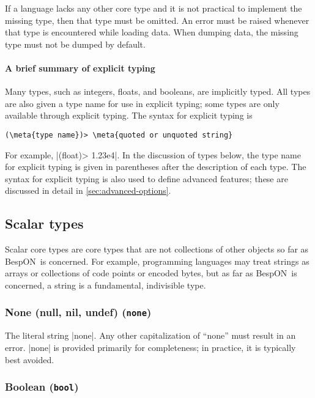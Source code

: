 \documentclass[11pt]{article}
\newcommand{\bespon}{BespON}
\newcommand{\meta}[1]{\ensuremath{\langle}\textit{#1}\ensuremath{\rangle}}
\begin{document}
If a language lacks any other core type and it is not practical to implement the missing type, then that type must be omitted.  An error must be raised whenever that type is encountered while loading data.  When dumping data, the missing type must not be dumped by default.


\paragraph{A brief summary of explicit typing}

Many types, such as integers, floats, and booleans, are implicitly typed.  All types are also given a type name for use in explicit typing; some types are only available through explicit typing.  The syntax for explicit typing is
\begin{Verbatim}[commandchars=\\\{\}]
(\meta{type name})> \meta{quoted or unquoted string}
\end{Verbatim}
For example, |(float)> 1.23e4|.  In the discussion of types below, the type name for explicit typing is given in parentheses after the description of each type.  The syntax for explicit typing is also used to define advanced features; these are discussed in detail in \cref{sec:advanced-options}.


\subsection{Scalar types}

Scalar core types are core types that are not collections of other objects so far as \bespon\ is concerned.  For example, programming languages may treat strings as arrays or collections of code points or encoded bytes, but as far as \bespon\ is concerned, a string is a fundamental, indivisible type.


\subsubsection{None (null, nil, undef) (\texttt{none})}

The literal string |none|.  Any other capitalization of ``none'' must result in an error.  |none| is provided primarily for completeness; in practice, it is typically best avoided.


\subsubsection{Boolean (\texttt{bool})}
\end{document}
